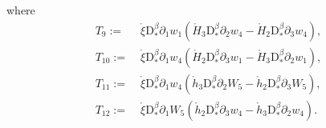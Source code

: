 \documentclass[twoside,11pt]{article}
\numberwithin{equation}{section}
\def\p{\partial}
\begin{document}
where
\begin{align}
	\nonumber 	T_9:=\; &{\mathring{\xi} } \mathrm{D}_*^{\beta}\p_1 w_1
	\left({ \mathring{H}_3}  \mathrm{D}_*^{\beta}\p_2 {w_4}
	-{ \mathring{H}_2}  \mathrm{D}_*^{\beta}\p_3 {w_4} \right),
	\\[1mm]
	\nonumber 	T_{10}:=\; &{\mathring{\xi} } \mathrm{D}_*^{\beta}\p_1 {w_4}
	\left(
	{ \mathring{H}_2}  \mathrm{D}_*^{\beta}\p_3 w_1
	-{ \mathring{H}_3}  \mathrm{D}_*^{\beta}\p_2 w_1 \right),
	\\[1mm]
	\nonumber 	T_{11}:=\; &{\mathring{\xi} } \mathrm{D}_*^{\beta}\p_1 {w_4}
	\left({ \mathring{h}_3}  \mathrm{D}_*^{\beta}\p_2 W_5
	-{ \mathring{h}_2}  \mathrm{D}_*^{\beta}\p_3 W_5 \right),
	\\[1mm]
	\nonumber 	T_{12}:=\; &{\mathring{\xi} } \mathrm{D}_*^{\beta}\p_1 W_5
	\left(
	{ \mathring{h}_2}  \mathrm{D}_*^{\beta}\p_3 {w_4}
	-{ \mathring{h}_3}  \mathrm{D}_*^{\beta}\p_2 {w_4}
	\right).
\end{align}
\end{document}

